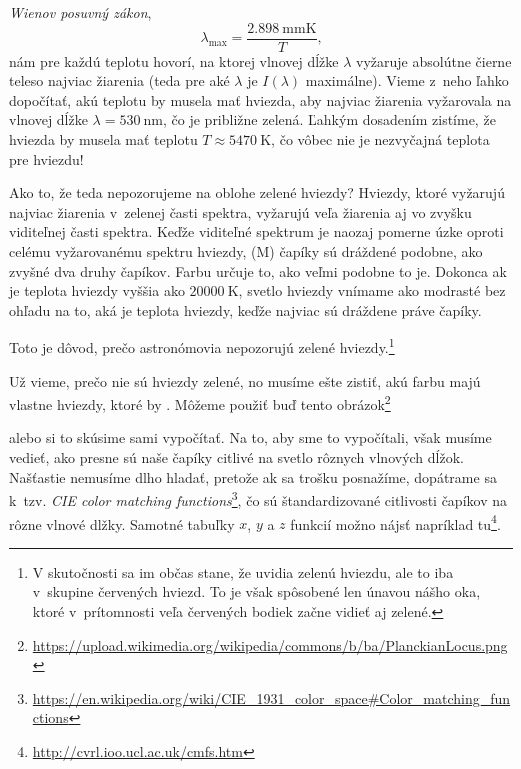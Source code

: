 \emph{Wienov posuvný zákon},
$$
  \lambda_{\text{max}} = \frac{\SI{2.898}{\milli\metre\kelvin}}{T}\text{,}
$$
nám pre každú teplotu hovorí, na ktorej vlnovej dĺžke $\lambda$ vyžaruje absolútne čierne teleso najviac žiarenia (teda pre aké $\lambda$ je $I(\lambda)$ maximálne). Vieme z~neho ľahko dopočítať, akú teplotu by musela mať hviezda, aby najviac žiarenia vyžarovala na vlnovej dĺžke $\lambda = \SI{530}{\nano\metre}$, čo je približne zelená.
Ľahkým dosadením zistíme, že hviezda by musela mať teplotu $T \approx \SI{5470}{\kelvin}$, čo vôbec nie je nezvyčajná teplota pre hviezdu! 

Ako to, že teda nepozorujeme na oblohe zelené hviezdy? Hviezdy, ktoré vyžarujú najviac žiarenia v~zelenej časti spektra, vyžarujú veľa žiarenia aj vo zvyšku viditeľnej časti spektra.
Keďže viditeľné spektrum je naozaj pomerne úzke oproti celému vyžarovanému spektru hviezdy,  (M) čapíky sú dráždené podobne, ako zvyšné dva druhy čapíkov.
Farbu určuje to, ako veľmi podobne to je. Dokonca ak je teplota hviezdy vyššia ako $\SI{20000}{\kelvin}$, svetlo hviezdy vnímame ako modrasté bez ohľadu na to, aká je teplota hviezdy,
keďže najviac sú dráždene práve  čapíky.

Toto je dôvod, prečo astronómovia nepozorujú zelené hviezdy.\footnote{V skutočnosti sa im občas stane,
že uvidia zelenú hviezdu, ale to iba v~skupine červených hviezd. To je však spôsobené len únavou nášho oka, ktoré v~prítomnosti veľa červených bodiek začne vidieť aj zelené.}

Už vieme, prečo nie sú hviezdy zelené, no musíme ešte zistiť, akú farbu majú vlastne hviezdy, ktoré by .
Môžeme použiť buď tento obrázok\footnote{\url{https://upload.wikimedia.org/wikipedia/commons/b/ba/PlanckianLocus.png}}


\hspace{-0.7cm} alebo si to skúsime sami vypočítať. Na to, aby sme to vypočítali, však musíme vedieť, ako presne sú naše čapíky citlivé na svetlo rôznych vlnových dĺžok.
Našťastie nemusíme dlho hladať, pretože ak sa trošku posnažíme, dopátrame sa k~tzv. \emph{CIE color matching functions}\footnote{\url{https://en.wikipedia.org/wiki/CIE_1931_color_space#Color_matching_functions}},
čo sú štandardizované citlivosti čapíkov na rôzne vlnové dlžky. Samotné tabuľky $x$, $y$ a $z$ funkcií možno nájsť napríklad tu\footnote{\url{http://cvrl.ioo.ucl.ac.uk/cmfs.htm}}.

